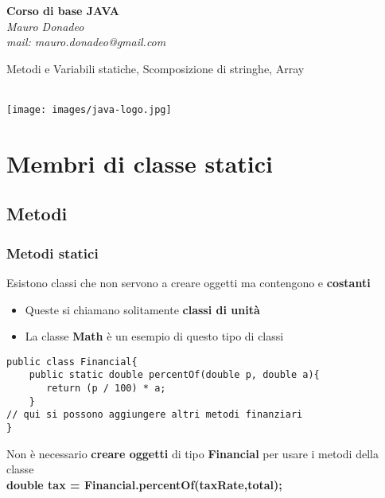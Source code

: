 \begin{frame}
	\begin{block}{}
		\begin{center}
			{\large\textbf{Corso di base JAVA}}\\
			\itshape{Mauro Donadeo}\\
			mail: mauro.donadeo@gmail.com
		\end{center}
	\end{block}
	\begin{block}{}	
		\begin{center}
			\begin{huge}
			Metodi e Variabili statiche, Scomposizione di stringhe, Array
			\end{huge}\\
			\texttt{[image: images/java-logo.jpg]}
		\end{center}
	\end{block}	
\end{frame}

\section*{Membri di classe statici}
\subsection*{Metodi}
\begin{frame}[fragile]
\frametitle{Metodi statici}
\begin{block}{}
Esistono classi che non servono a creare oggetti ma contengono \textbf{} e \textbf{costanti}
\begin{itemize}
\item Queste si chiamano solitamente \textbf{\alert{classi di unità}}
\item La classe \textbf{Math} è un esempio di questo tipo di classi
\end{itemize}
\end{block}
\pause
\begin{lstlisting}
public class Financial{
    public static double percentOf(double p, double a){
       return (p / 100) * a; 
    }
// qui si possono aggiungere altri metodi finanziari
}
\end{lstlisting}
\begin{block}{}\footnotesize
Non è necessario \textbf{creare oggetti} di tipo \textbf{Financial} per usare i metodi della classe\\
\hspace{0.8cm} \textbf{double tax = Financial.percentOf(taxRate,total);}
\end{block}
\end{frame}

